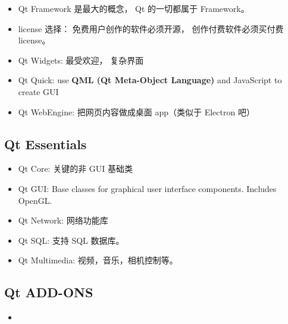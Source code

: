 
\begin{issues}
\issueDraft
\end{issues}

\begin{itemize}
\item Qt Framework 是最大的概念， Qt 的一切都属于 Framework。
\item license 选择： 免费用户创作的软件必须开源， 创作付费软件必须买付费 license。
\item Qt Widgets: 最受欢迎， 复杂界面
\item Qt Quick: use \textbf{QML (Qt Meta-Object Language)} and JavaScript to create GUI
\item Qt WebEngine: 把网页内容做成桌面 app（类似于 Electron 吧）
\end{itemize}


\subsection{Qt Essentials}
\begin{itemize}
\item Qt Core: 关键的非 GUI 基础类
\item Qt GUI: Base classes for graphical user interface components. Includes OpenGL.
\item Qt Network: 网络功能库
\item Qt SQL: 支持 SQL 数据库。
\item Qt Multimedia: 视频，音乐，相机控制等。
\end{itemize}

\subsection{Qt ADD-ONS}
\begin{itemize}
\item 
\end{itemize}
